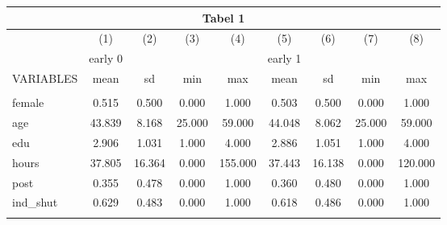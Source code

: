\documentclass[]{article}
\begin{document}
\begin{tabular}{lcccccccc}
\multicolumn{9}{c}{Tabel 1} \\ \hline
 & (1) & (2) & (3) & (4) & (5) & (6) & (7) & (8) \\
 & early 0 &  &  &  & early 1 &  &  &  \\
VARIABLES & mean & sd & min & max & mean & sd & min & max \\ \hline
 &  &  &  &  &  &  &  &  \\
female & 0.515 & 0.500 & 0.000 & 1.000 & 0.503 & 0.500 & 0.000 & 1.000 \\
age & 43.839 & 8.168 & 25.000 & 59.000 & 44.048 & 8.062 & 25.000 & 59.000 \\
edu & 2.906 & 1.031 & 1.000 & 4.000 & 2.886 & 1.051 & 1.000 & 4.000 \\
hours & 37.805 & 16.364 & 0.000 & 155.000 & 37.443 & 16.138 & 0.000 & 120.000 \\
post & 0.355 & 0.478 & 0.000 & 1.000 & 0.360 & 0.480 & 0.000 & 1.000 \\
ind\_shut & 0.629 & 0.483 & 0.000 & 1.000 & 0.618 & 0.486 & 0.000 & 1.000 \\
 &  &  &  &  &  &  &  &  \\ \hline
\end{tabular}
\end{document}
